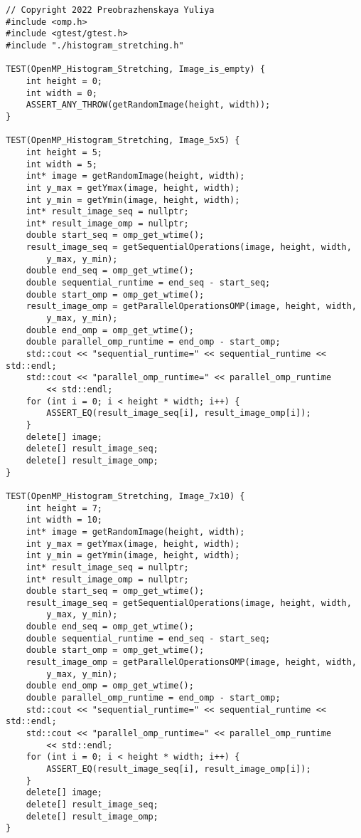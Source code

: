\documentclass{report}
\begin{document}
\begin{lstlisting}
// Copyright 2022 Preobrazhenskaya Yuliya
#include <omp.h>
#include <gtest/gtest.h>
#include "./histogram_stretching.h"

TEST(OpenMP_Histogram_Stretching, Image_is_empty) {
    int height = 0;
    int width = 0;
    ASSERT_ANY_THROW(getRandomImage(height, width));
}

TEST(OpenMP_Histogram_Stretching, Image_5x5) {
    int height = 5;
    int width = 5;
    int* image = getRandomImage(height, width);
    int y_max = getYmax(image, height, width);
    int y_min = getYmin(image, height, width);
    int* result_image_seq = nullptr;
    int* result_image_omp = nullptr;
    double start_seq = omp_get_wtime();
    result_image_seq = getSequentialOperations(image, height, width,
        y_max, y_min);
    double end_seq = omp_get_wtime();
    double sequential_runtime = end_seq - start_seq;
    double start_omp = omp_get_wtime();
    result_image_omp = getParallelOperationsOMP(image, height, width,
        y_max, y_min);
    double end_omp = omp_get_wtime();
    double parallel_omp_runtime = end_omp - start_omp;
    std::cout << "sequential_runtime=" << sequential_runtime << std::endl;
    std::cout << "parallel_omp_runtime=" << parallel_omp_runtime
        << std::endl;
    for (int i = 0; i < height * width; i++) {
        ASSERT_EQ(result_image_seq[i], result_image_omp[i]);
    }
    delete[] image;
    delete[] result_image_seq;
    delete[] result_image_omp;
}

TEST(OpenMP_Histogram_Stretching, Image_7x10) {
    int height = 7;
    int width = 10;
    int* image = getRandomImage(height, width);
    int y_max = getYmax(image, height, width);
    int y_min = getYmin(image, height, width);
    int* result_image_seq = nullptr;
    int* result_image_omp = nullptr;
    double start_seq = omp_get_wtime();
    result_image_seq = getSequentialOperations(image, height, width,
        y_max, y_min);
    double end_seq = omp_get_wtime();
    double sequential_runtime = end_seq - start_seq;
    double start_omp = omp_get_wtime();
    result_image_omp = getParallelOperationsOMP(image, height, width,
        y_max, y_min);
    double end_omp = omp_get_wtime();
    double parallel_omp_runtime = end_omp - start_omp;
    std::cout << "sequential_runtime=" << sequential_runtime << std::endl;
    std::cout << "parallel_omp_runtime=" << parallel_omp_runtime
        << std::endl;
    for (int i = 0; i < height * width; i++) {
        ASSERT_EQ(result_image_seq[i], result_image_omp[i]);
    }
    delete[] image;
    delete[] result_image_seq;
    delete[] result_image_omp;
}


\end{lstlisting}
\end{document}
